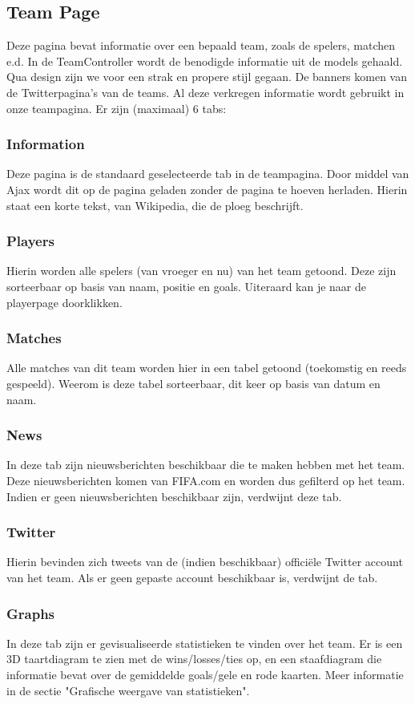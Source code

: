 \documentclass[11pt, a4paper]{article}
\begin{document}
\subsection{Team Page}
Deze pagina bevat informatie over een bepaald team, zoals de spelers, matchen e.d.
In de TeamController wordt de benodigde informatie uit de models gehaald.
Qua design zijn we voor een strak en propere stijl gegaan. De banners komen van de Twitterpagina's van de teams.
Al deze verkregen informatie wordt gebruikt in onze teampagina. Er zijn (maximaal) 6 tabs:
\subsubsection{Information}
Deze pagina is de standaard geselecteerde tab in de teampagina. Door middel van Ajax wordt dit op de pagina geladen zonder de pagina te hoeven herladen.
Hierin staat een korte tekst, van Wikipedia, die de ploeg beschrijft.
\subsubsection{Players}
Hierin worden alle spelers (van vroeger en nu) van het team getoond. Deze zijn sorteerbaar op basis van naam, positie en goals. Uiteraard kan je naar de playerpage doorklikken.
\subsubsection{Matches}
Alle matches van dit team worden hier in een tabel getoond (toekomstig en reeds gespeeld). Weerom is deze tabel sorteerbaar, dit keer op basis van datum en naam.
\subsubsection{News}
In deze tab zijn nieuwsberichten beschikbaar die te maken hebben met het team. Deze nieuwsberichten komen van FIFA.com en worden dus gefilterd op het team. Indien er geen nieuwsberichten beschikbaar zijn, verdwijnt deze tab.
\subsubsection{Twitter}
Hierin bevinden zich tweets van de (indien beschikbaar) offici\"ele Twitter account van het team. Als er geen gepaste account beschikbaar is, verdwijnt de tab.
\subsubsection{Graphs}
In deze tab zijn er gevisualiseerde statistieken te vinden over het team. Er is een 3D taartdiagram te zien met de wins/losses/ties op, en een staafdiagram die informatie bevat over de gemiddelde goals/gele en rode kaarten. Meer informatie in de sectie "Grafische weergave van statistieken".
\end{document}
